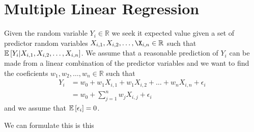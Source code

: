 \documentclass[fleqn,11pt]{article}
\begin{document}
\section{Multiple Linear Regression}
Given the random variable $Y_i \in \mathbb{R}$ we seek it expected value given a set of predictor random variables
$X_{i,1}, X_{i,2}, \dots, \X_{i,n} \in \mathbb{R}$ such that $\mathbb{E} \left[ Y_i \middle| X_{i,1},X_{i,2},\dots,X_{i,n} \right]$. We assume
that a reasonable prediction of $Y_i$ can be made from a linear combination of the predictor variables and we want
to find the coeficients $w_1, w_2, \dots, w_n \in \mathbb{R}$ such that
\begin{align}
    Y_i &= w_0 + w_1 X_{i,1} + w_1 X_{i,2} + \dots + w_n X_{i,n} + \epsilon_i \\
        &= w_0 + \sum_{j=1}^n w_j X_{i,j} + \epsilon_i
\end{align}
and we assume that $\mathbb{E} \left[ \epsilon_i \right] = 0$.

We can formulate this is this
\end{document}
